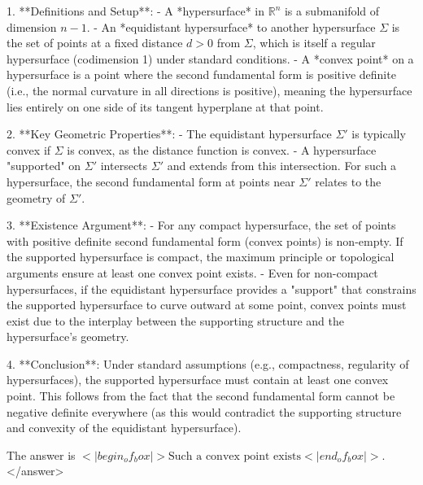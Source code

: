 1. **Definitions and Setup**:  
   - A *hypersurface* in \( \mathbb{R}^n \) is a submanifold of dimension \( n-1 \).  
   - An *equidistant hypersurface* to another hypersurface \( \Sigma \) is the set of points at a fixed distance \( d > 0 \) from \( \Sigma \), which is itself a regular hypersurface (codimension 1) under standard conditions.  
   - A *convex point* on a hypersurface is a point where the second fundamental form is positive definite (i.e., the normal curvature in all directions is positive), meaning the hypersurface lies entirely on one side of its tangent hyperplane at that point.  

2. **Key Geometric Properties**:  
   - The equidistant hypersurface \( \Sigma' \) is typically convex if \( \Sigma \) is convex, as the distance function is convex.  
   - A hypersurface "supported" on \( \Sigma' \) intersects \( \Sigma' \) and extends from this intersection. For such a hypersurface, the second fundamental form at points near \( \Sigma' \) relates to the geometry of \( \Sigma' \).  

3. **Existence Argument**:  
   - For any compact hypersurface, the set of points with positive definite second fundamental form (convex points) is non-empty. If the supported hypersurface is compact, the maximum principle or topological arguments ensure at least one convex point exists.  
   - Even for non-compact hypersurfaces, if the equidistant hypersurface provides a "support" that constrains the supported hypersurface to curve outward at some point, convex points must exist due to the interplay between the supporting structure and the hypersurface's geometry.  

4. **Conclusion**:  
   Under standard assumptions (e.g., compactness, regularity of hypersurfaces), the supported hypersurface must contain at least one convex point. This follows from the fact that the second fundamental form cannot be negative definite everywhere (as this would contradict the supporting structure and convexity of the equidistant hypersurface).  

The answer is \(<|begin_of_box|>\text{Such a convex point exists}<|end_of_box|>\).</answer>